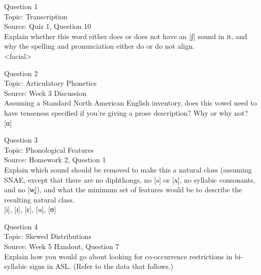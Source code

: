\documentclass[12pt]{article}
\begin{document}
{\large Question 1}\\

Topic: Transcription\\
Source: Quiz 1, Question 10\\

Explain whether this word either does or does not have an [ʃ] sound in it, and why the spelling and pronunciation either do or do not align.\\

<facial>


\newpage

{\large Question 2}\\

Topic: Articulatory Phonetics\\
Source: Week 3 Discussion\\

Assuming a Standard North American English inventory, does this vowel need to have tenseness specified if you're giving a prose description? Why or why not?\\

{[ɑ]}


\newpage

{\large Question 3}\\

Topic: Phonological Features\\
Source: Homework 2, Question 1\\

Explain which sound should be removed to make this a natural class (assuming SNAE, except that there are no diphthongs, no [ə] or [ʌ], no syllabic consonants, and no [w̥]), and what the minimum set of features would be to describe the resulting natural class.\\

{[i]}, {[ɪ]}, {[ɛ]}, {[u]}, {[ʊ]}


\newpage

{\large Question 4}\\

Topic: Skewed Distributions\\
Source: Week 5 Handout, Question 7\\

Explain how you would go about looking for co-occurrence restrictions in bi-syllabic signs in ASL. (Refer to the data that follows.)\\
\end{document}
